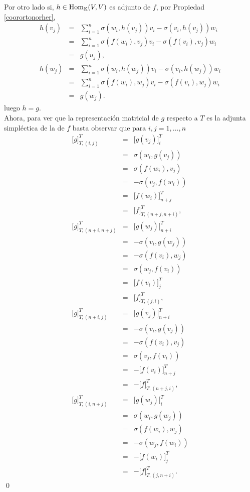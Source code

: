 Por otro lado si, $h\in\operatorname{Hom}_\mathbb{K}(V,V)$ es adjunto de $f$, por Propiedad \ref{coorortonorher},
\begin{eqnarray*}
h(v_j) & = & \sum_{i=1}^n \sigma\left(w_i,h(v_j)\right)v_i-\sigma\left(v_i,h(v_j)\right)w_i\\
         & = & \sum_{i=1}^n \sigma\left(f(w_i),v_j\right)v_i-\sigma\left(f(v_i),v_j\right)w_i\\
         & = & g(u_j),\\
h(w_j) & = & \sum_{i=1}^n \sigma\left(w_i,h(w_j)\right)v_i-\sigma\left(v_i,h(w_j)\right)w_i\\
         & = & \sum_{i=1}^n \sigma\left(f(w_i),w_j\right)v_i-\sigma\left(f(v_i),w_j\right)w_i\\
         & = & g(w_j).       
\end{eqnarray*}
luego $h=g$.\\
Ahora, para ver que la representaci\'on matricial de $g$ respecto a $T$ es la adjunta simpl\'ectica de la de $f$ basta observar que para $i,j=1,\ldots,n$
\begin{eqnarray*}
\Big[g\Big]^T_{T,(i,j)} & = & \Big[g(v_j)\Big]^T_i\\
  & = & \sigma\left(w_i,g(v_j)\right)\\
  & = & \sigma\left(f(w_i),v_j\right)\\
  & = & -\sigma\left(v_j,f(w_i)\right)\\
  & = & \Big[f(w_i)\Big]^T_{n+j}\\
  & = & \Big[f\Big]^T_{T,(n+j,n+i)},\\
\Big[g\Big]^T_{T,(n+i,n+j)} & = & \Big[g(w_j)\Big]^T_{n+i}\\
  & = & -\sigma\left(v_i,g(w_j)\right)\\
  & = & -\sigma\left(f(v_i),w_j\right)\\
  & = & \sigma\left(w_j,f(v_i)\right)\\
  & = & \Big[f(v_i)\Big]^T_{j}\\
  & = & \Big[f\Big]^T_{T,(j,i)},\\
\Big[g\Big]^T_{T,(n+i,j)} & = & \Big[g(v_j)\Big]^T_{n+i}\\
  & = & -\sigma\left(v_i,g(v_j)\right)\\
  & = & -\sigma\left(f(v_i),v_j\right)\\
  & = & \sigma\left(v_j,f(v_i)\right)\\
  & = & -\Big[f(v_i)\Big]^T_{n+j}\\
  & = & -\Big[f\Big]^T_{T,(n+j,i)},\\
\Big[g\Big]^T_{T,(i,n+j)} & = & \Big[g(w_j)\Big]^T_i\\
  & = & \sigma\left(w_i,g(w_j)\right)\\
  & = & \sigma\left(f(w_i),w_j\right)\\
  & = & -\sigma\left(w_j,f(w_i)\right)\\
  & = & -\Big[f(w_i)\Big]^T_{j}\\
  & = & -\Big[f\Big]^T_{T,(j,n+i)}.
\end{eqnarray*}
\qed

